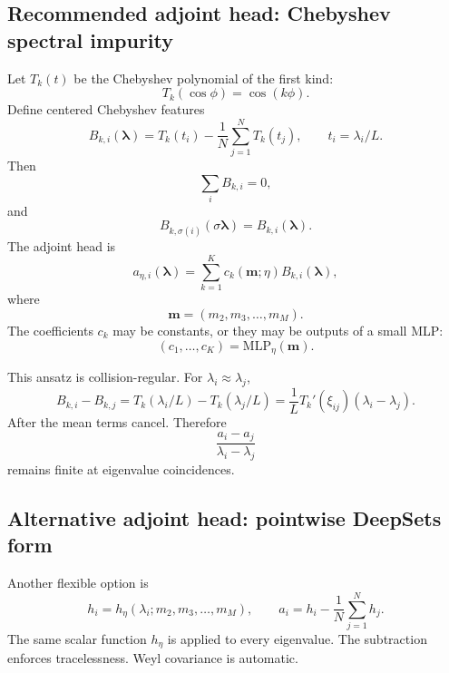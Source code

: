 \documentclass[11pt]{article}
\begin{document}
\subsection{Recommended adjoint head: Chebyshev spectral impurity}

Let $T_k(t)$ be the Chebyshev polynomial of the first kind:
\begin{equation}
T_k(\cos\phi)=\cos(k\phi).
\end{equation}
Define centered Chebyshev features
\begin{equation}
\boxed{
B_{k,i}(\bm\lambda)
=T_k(t_i)-\frac1N\sum_{j=1}^N T_k(t_j),
\qquad t_i=\lambda_i/L.
}
\label{eq:centered_chebyshev_feature}
\end{equation}
Then
\begin{equation}
\sum_iB_{k,i}=0,
\end{equation}
and
\begin{equation}
B_{k,\sigma(i)}(\sigma\bm\lambda)=B_{k,i}(\bm\lambda).
\end{equation}
The adjoint head is
\begin{equation}
\boxed{
 a_{\eta,i}(\bm\lambda)=\sum_{k=1}^K c_k(\bm m;\eta)B_{k,i}(\bm\lambda),
}
\label{eq:chebyshev_adjoint_head}
\end{equation}
where
\begin{equation}
\bm m=(m_2,m_3,\ldots,m_M).
\end{equation}
The coefficients $c_k$ may be constants, or they may be outputs of a small MLP:
\begin{equation}
(c_1,\ldots,c_K)=\mathrm{MLP}_\eta(\bm m).
\end{equation}

This ansatz is collision-regular.  For $\lambda_i\approx\lambda_j$,
\begin{equation}
B_{k,i}-B_{k,j}=T_k(\lambda_i/L)-T_k(\lambda_j/L)
=\frac1L T_k'(\xi_{ij})(\lambda_i-\lambda_j).
\end{equation}
After the mean terms cancel.  Therefore
\begin{equation}
\frac{a_i-a_j}{\lambda_i-\lambda_j}
\end{equation}
remains finite at eigenvalue coincidences.

\subsection{Alternative adjoint head: pointwise DeepSets form}

Another flexible option is
\begin{equation}
\boxed{
 h_i=h_\eta(\lambda_i;m_2,m_3,\ldots,m_M),
\qquad
 a_i=h_i-\frac1N\sum_{j=1}^Nh_j.
}
\label{eq:pointwise_deepset_head}
\end{equation}
The same scalar function $h_\eta$ is applied to every eigenvalue.  The subtraction enforces tracelessness.  Weyl covariance is automatic.
\end{document}
